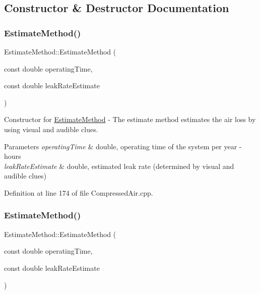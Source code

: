 \subsection{Constructor \& Destructor Documentation}
\mbox{\label{class_estimate_method_a06b06991a5f48051a6c698be0fa31f1d}} 
\subsubsection{\texorpdfstring{Estimate\+Method()}{EstimateMethod()}\hspace{0.1cm}{\footnotesize\ttfamily [1/3]}}
{\footnotesize\ttfamily Estimate\+Method\+::\+Estimate\+Method (\begin{DoxyParamCaption}\item[{const double}]{operating\+Time,  }\item[{const double}]{leak\+Rate\+Estimate }\end{DoxyParamCaption})}

Constructor for \hyperlink{class_estimate_method}{Estimate\+Method} -\/ The estimate method estimates the air loss by using visual and audible clues. 
\begin{DoxyParams}{Parameters}
{\em operating\+Time} & double, operating time of the system per year -\/ hours \\
\hline
{\em leak\+Rate\+Estimate} & double, estimated leak rate (determined by visual and audible clues) \\
\hline
\end{DoxyParams}


Definition at line 174 of file Compressed\+Air.\+cpp.

\mbox{\label{class_estimate_method_a06b06991a5f48051a6c698be0fa31f1d}} 
\subsubsection{\texorpdfstring{Estimate\+Method()}{EstimateMethod()}\hspace{0.1cm}{\footnotesize\ttfamily [2/3]}}
{\footnotesize\ttfamily Estimate\+Method\+::\+Estimate\+Method (\begin{DoxyParamCaption}\item[{const double}]{operating\+Time,  }\item[{const double}]{leak\+Rate\+Estimate }\end{DoxyParamCaption})}

